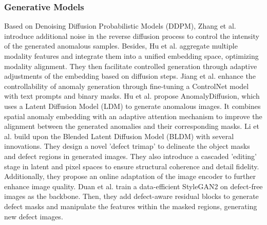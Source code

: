 \documentclass[journal,comsoc]{IEEEtran}
\begin{document}
\subsubsection{Generative Models}
Based on Denoising Diffusion Probabilistic Models (DDPM), Zhang et al. \cite{zhang2024realnet} introduce additional noise in the reverse diffusion process to control the intensity of the generated anomalous samples. Besides, Hu et al. \cite{hu2024anomalyxfusion} aggregate multiple modality features and integrate them into a unified embedding space, optimizing modality alignment. They then facilitate controlled generation through adaptive adjustments of the embedding based on diffusion steps. Jiang et al. \cite{jiang2024cagen} enhance the controllability of anomaly generation through fine-tuning a ControlNet model with text prompts and binary masks. Hu et al. \cite{hu2024anomalydiffusion} propose AnomalyDiffusion, which uses a Latent Diffusion Model (LDM) to generate anomalous images. It combines spatial anomaly embedding with an adaptive attention mechanism to improve the alignment between the generated anomalies and their corresponding masks. Li et al. \cite{li2024adabldm} build upon the Blended Latent Diffusion Model (BLDM) \cite{rombach2022high} with several innovations. They design a novel ’defect trimap’ to delineate the object masks and defect regions in generated images. They also introduce a cascaded ’editing’ stage in latent and pixel spaces to ensure structural coherence and detail fidelity. Additionally, they propose an online adaptation of the image encoder to further enhance image quality. Duan et al. \cite{duan2023dfmgan} train a data-efficient StyleGAN2 on defect-free images as the backbone. Then, they add defect-aware residual blocks to generate defect masks and manipulate the features within the masked regions, generating new defect images.
\end{document}
